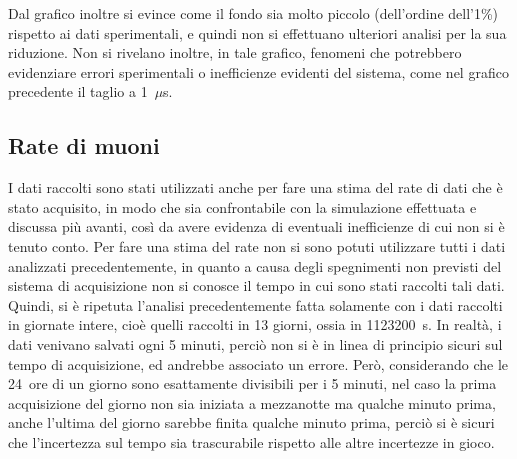Dal grafico inoltre si evince come il fondo sia molto piccolo (dell'ordine dell'1\%) rispetto ai dati sperimentali, e quindi non si effettuano ulteriori analisi per la sua riduzione. Non si rivelano inoltre, in tale grafico, fenomeni che potrebbero evidenziare errori sperimentali o inefficienze evidenti del sistema, come nel grafico precedente il taglio a 1~$\mu$s.

\subsection{Rate di muoni}
I dati raccolti sono stati utilizzati anche per fare una stima del rate di dati che è stato acquisito, in modo che sia confrontabile con la simulazione effettuata e discussa più avanti, così da avere evidenza di eventuali inefficienze di cui non si è tenuto conto. Per fare una stima del rate non si sono potuti utilizzare tutti i dati analizzati precedentemente, in quanto a causa degli spegnimenti non previsti del sistema di acquisizione non si conosce il tempo in cui sono stati raccolti tali dati.\\

Quindi, si è ripetuta l'analisi precedentemente fatta solamente con i dati raccolti in giornate intere, cioè quelli raccolti in 13 giorni, ossia in 1123200~s. In realtà, i dati venivano salvati ogni 5 minuti, perciò non si è in linea di principio sicuri sul tempo di acquisizione, ed andrebbe associato un errore. Però, considerando che le 24~ore di un giorno sono esattamente divisibili per i 5 minuti, nel caso la prima acquisizione del giorno non sia iniziata a mezzanotte ma qualche minuto prima, anche l'ultima del giorno sarebbe finita qualche minuto prima, perciò si è sicuri che l'incertezza sul tempo sia trascurabile rispetto alle altre incertezze in gioco.\\

